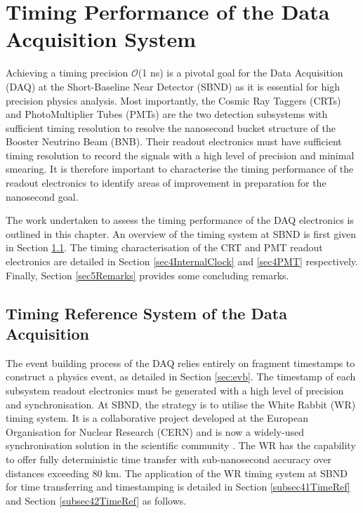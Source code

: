 \chapter{Timing Performance of the Data Acquisition System}
\label{ChapterDAQ}
\ifpdf
    \graphicspath{{Chapter7/Figs/Raster/}{Chapter7/Figs/PDF/}{Chapter7/Figs/}}
\else
    \graphicspath{{Chapter7/Figs/Vector/}{Chapter7/Figs/}}
\fi

Achieving a timing precision $\mathcal{O}$(1 ns) is a pivotal goal for the Data Acquisition (DAQ) at the Short-Baseline Near Detector (SBND) as it is essential for high precision physics analysis. 
Most importantly, the Cosmic Ray Taggers (CRTs) and PhotoMultiplier Tubes (PMTs) are the two detection subsystems with sufficient timing resolution to resolve the nanosecond bucket structure of the Booster Neutrino Beam (BNB).
Their readout electronics must have sufficient timing resolution to record the signals with a high level of precision and minimal smearing.
It is therefore important to characterise the timing performance of the readout electronics to identify areas of improvement in preparation for the nanosecond goal. 

The work undertaken to assess the timing performance of the DAQ electronics is outlined in this chapter.
An overview of the timing system at SBND is first given in Section \ref{sec4TimeRef}. 
The timing characterisation of the CRT and PMT readout electronics are detailed in Section \ref{sec4InternalClock} and \ref{sec4PMT} respectively.
Finally, Section \ref{sec5Remarks} provides some concluding remarks.

\section{Timing Reference System of the Data Acquisition}
\label{sec4TimeRef}

The event building process of the DAQ relies entirely on fragment timestamps to construct a physics event, as detailed in Section \ref{sec:evb}.
The timestamp of each subsystem readout electronics must be generated with a high level of precision and synchronisation.
At SBND, the strategy is to utilise the White Rabbit (WR) timing system.
It is a collaborative project developed at the European Organisation for Nuclear Research (CERN) and is now a widely-used synchronisation solution in the scientific community \cite{WR_paper}.
The WR has the capability to offer fully deterministic time transfer with sub-nanosecond accuracy over distances exceeding 80 km.
The application of the WR timing system at SBND for time transferring and timestamping is detailed in Section \ref{subsec41TimeRef} and Section \ref{subsec42TimeRef} as follows.

